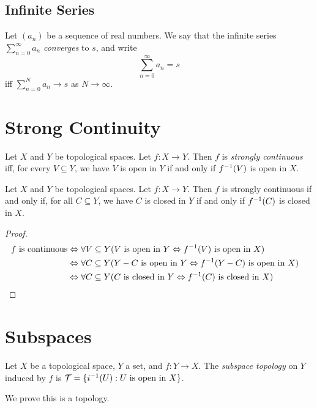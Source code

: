 \subsection{Infinite Series}

\begin{df}[Series]
Let $(a_n)$ be a sequence of real numbers. We say that the infinite series $\sum_{n=0}^\infty a_n$ \emph{converges} to $s$, and write
\[ \sum_{n=0}^\infty a_n = s \]
iff $\sum_{n=0}^N a_n \rightarrow s$ as $N \rightarrow \infty$.
\end{df}

\section{Strong Continuity}

\begin{df}
Let $X$ and $Y$ be topological spaces. Let $f : X \rightarrow Y$. Then $f$ is \emph{strongly continuous} iff, for every $V \subseteq Y$, we have $V$ is open in $Y$ if and only if ${f}^{-1}(V)$ is open in $X$.
\end{df}

\begin{prop}
Let $X$ and $Y$ be topological spaces. Let $f : X \rightarrow Y$. Then $f$ is strongly continuous if and only if, for all $C \subseteq Y$, we have $C$ is closed in $Y$ if and only if ${f}^{-1}(C)$ is closed in $X$.
\end{prop}

\begin{proof}
\pf
\begin{align*}
f \text{ is continuous} & \Leftrightarrow \forall V \subseteq Y ( V \text{ is open in } Y \Leftrightarrow {f}^{-1}(V) \text{ is open in } X) \\
& \Leftrightarrow \forall C \subseteq Y (Y - C \text{ is open in } Y \Leftrightarrow {f}^{-1}(Y - C) \text{ is open in } X) \\
& \Leftrightarrow \forall C \subseteq Y (C \text{ is closed in } Y \Leftrightarrow {f}^{-1}(C) \text{ is closed in } X) & \relax
\end{align*}
\end{proof}

\section{Subspaces}

\begin{df}[Subspace]
Let $X$ be a topological space, $Y$ a set, and $f : Y \rightarrow X$. The \emph{subspace topology} on $Y$ induced by $f$ is $\mathcal{T} = \{ {i}^{-1}(U) : U \text{ is open in } X \}$.

We prove this is a topology.
\end{df}

